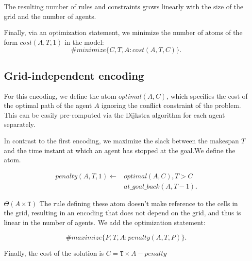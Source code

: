 The resulting number of rules and constraints grows linearly with the size of the grid and the number of agents.


Finally, via an optimization statement, we minimize the number of atoms of the form $cost(A,T,1)$ in the model:
\[ \#minimize \{C,T,A : cost(A,T,C)\}.\]


\subsection{Grid-independent encoding}
For this encoding, we define the atom $optimal(A, C)$, which specifies the cost of the optimal path of the agent $A$ ignoring the conflict constraint of the problem. This can be easily pre-computed via the Dijkstra algorithm for each agent separately.



In contrast to the first encoding, we maximize the slack between the makespan $T$ and the time instant at which an agent has stopped at the goal.We define the atom.



\begin{align*} 
    penalty(A,T,1) \leftarrow &optimal(A,C), T > C \\ 
    &at\_goal\_back(A,T-1).
\end{align*}

$\Theta(A \times \mathtt{T})$ The rule defining these atom doesn't make reference to the cells in the grid, resulting in an encoding that does not depend on the grid, and thus is linear in the number of agents. We add the optimization statement:

\[ \#maximize \{P,T,A : penalty(A,T,P)\}.\]

Finally, the cost of the solution is $C = \mathtt{T} \times A - penalty $




